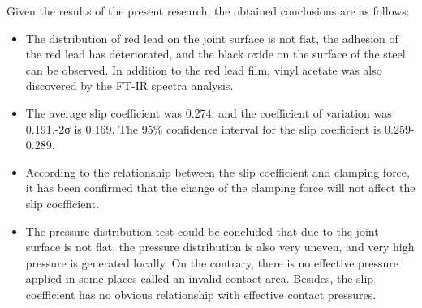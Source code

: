 Given the results of the present research, the obtained conclusions are as follows: 

\begin{itemize}
    \item The distribution of red lead on the joint surface is not flat, the adhesion of the red lead has deteriorated, and the black oxide on the surface of the steel can be observed. In addition to the red lead film, vinyl acetate was also discovered by the FT-IR spectra analysis. 

    \item The average slip coefficient was 0.274, and the coefficient of variation was 0.191.-2σ is 0.169. The 95\% confidence interval for the slip coefficient is 0.259-0.289. 

    \item According to the relationship between the slip coefficient and clamping force, it has been confirmed that the change of the clamping force will not affect the slip coefficient.

    \item The pressure distribution test could be concluded that due to the joint surface is not flat, the pressure distribution is also very uneven, and very high pressure is generated locally. On the contrary, there is no effective pressure applied in some places called an invalid contact area. Besides, the slip coefficient has no obvious relationship with effective contact pressures.
    
\end{itemize}